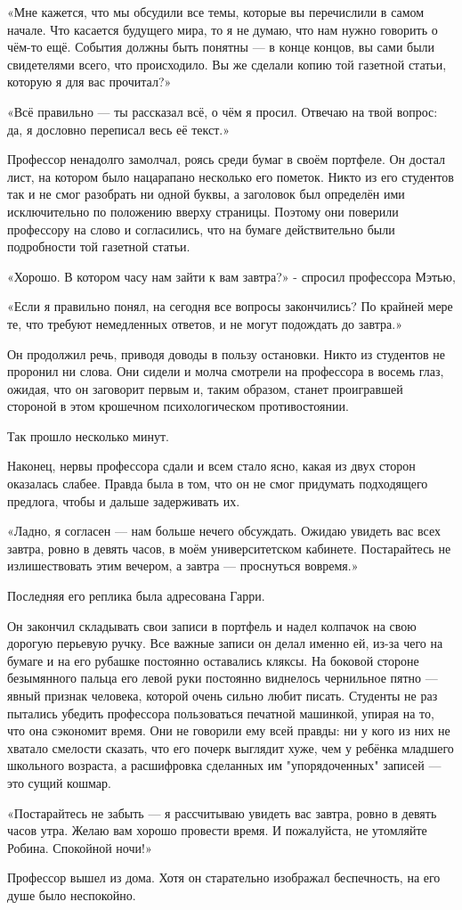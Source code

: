 \documentclass[a4paper,12pt]{book}
\begin{document}
\par
«Мне кажется, что мы обсудили все темы, которые вы перечислили в самом начале. Что касается будущего мира, то я не думаю, что нам нужно говорить о чём-то ещё. События должны быть понятны — в конце концов, вы сами были свидетелями всего, что происходило. Вы же сделали копию той газетной статьи, которую я для вас прочитал?»
\par
«Всё правильно — ты рассказал всё, о чём я просил. Отвечаю на твой вопрос: да, я дословно переписал весь её текст.»
\par
Профессор ненадолго замолчал, роясь среди бумаг в своём портфеле. Он достал лист, на котором было нацарапано несколько его пометок. Никто из его студентов так и не смог разобрать ни одной буквы, а заголовок был определён ими исключительно по положению вверху страницы. Поэтому они поверили профессору на слово и согласились, что на бумаге действительно были подробности той газетной статьи.
\par
«Хорошо. В котором часу нам зайти к вам завтра?» - спросил профессора Мэтью,
\par
«Если я правильно понял, на сегодня все вопросы закончились? По крайней мере те, что требуют немедленных ответов, и не могут подождать до завтра.»
\par
Он продолжил речь, приводя доводы в пользу остановки. Никто из студентов не проронил ни слова. Они сидели и молча смотрели на профессора в восемь глаз, ожидая, что он заговорит первым и, таким образом, станет проигравшей стороной в этом крошечном психологическом противостоянии.
\par
Так прошло несколько минут.
\par
Наконец, нервы профессора сдали и всем стало ясно, какая из двух сторон оказалась слабее. Правда была в том, что он не смог придумать подходящего предлога, чтобы и дальше задерживать их.
\par
«Ладно, я согласен — нам больше нечего обсуждать. Ожидаю увидеть вас всех завтра, ровно в девять часов, в моём университетском кабинете. Постарайтесь не излишествовать этим вечером, а завтра — проснуться вовремя.»
\par
Последняя его реплика была адресована Гарри.
\par
Он закончил складывать свои записи в портфель и надел колпачок на свою дорогую перьевую ручку. Все важные записи он делал именно ей, из-за чего на бумаге и на его рубашке постоянно оставались кляксы. На боковой стороне безымянного пальца его левой руки постоянно виднелось чернильное пятно — явный признак человека, которой очень сильно любит писать. Студенты не раз пытались убедить профессора пользоваться печатной машинкой, упирая на то, что она сэкономит время. Они не говорили ему всей правды: ни у кого из них не хватало смелости сказать, что его почерк выглядит хуже, чем у ребёнка младшего школьного возраста, а расшифровка сделанных им "упорядоченных" записей — это сущий кошмар.
\par
«Постарайтесь не забыть — я рассчитываю увидеть вас завтра, ровно в девять часов утра. Желаю вам хорошо провести время. И пожалуйста, не утомляйте Робина. Спокойной ночи!»
\par
Профессор вышел из дома. Хотя он старательно изображал беспечность, на его душе было неспокойно.
\end{document}
